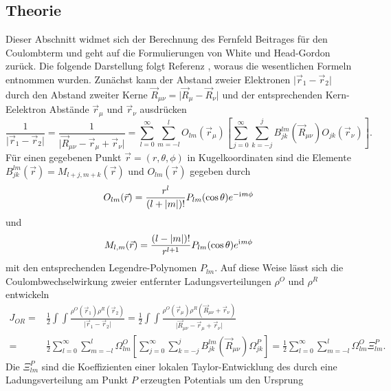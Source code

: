 	\subsection{Theorie}
	Dieser Abschnitt widmet sich der Berechnung des Fernfeld Beitrages für den Coulombterm und geht auf die Formulierungen von White und Head-Gordon\supercite{white1994derivation} zurück. Die folgende Darstellung folgt Referenz \supercite{sierka2003fast}, woraus die wesentlichen Formeln entnommen wurden. Zunächst kann der Abstand zweier Elektronen $\vert\vec{r}_1-\vec{r}_2\vert$ durch den Abstand zweiter Kerne $\vec{R}_{\mu\nu}=\vert\vec{R}_\mu-\vec{R}_\nu\vert$ und der entsprechenden Kern-Eelektron Abstände $\vec{r}_\mu$ und $\vec{r}_\nu$ ausdrücken
	\begin{equation}
	\frac{1}{\vert\vec{r}_1-\vec{r}_2\vert}=\frac{1}{\vert\vec{R}_{\mu\nu}-\vec{r}_\mu+\vec{r}_\nu\vert}=\sum_{l=0}^{\infty}\sum_{m=-l}^l O_{lm}(\vec{r}_\mu)\left[\sum_{j=0}^{\infty}\sum_{k=-j}^jB_{jk}^{lm}(\vec{R}_{\mu\nu})O_{jk}(\vec{r}_\nu)\right].
	\end{equation}
	Für einen gegebenen Punkt $\vec{r}=(r,\theta,\phi)$ in Kugelkoordinaten sind die Elemente $B_{jk}^{lm}(\vec{r})=M_{l+j,m+k}(\vec{r})$ und $O_{lm}(\vec{r})$ gegeben durch
	\begin{equation}
	O_{lm}(\vec{r})=\frac{r^l}{(l+\vert m\vert)!}P_{lm}(\cos \theta)e^{-\mathrm{i}\mkern1mu m\phi}
	\end{equation}
	und 
	\begin{equation}
	M_{l,m}(\vec{r})=\frac{(l-\vert m\vert)!}{r^{l+1}}P_{lm}(\cos \theta)e^{\mathrm{i}\mkern1mu m\phi}
	\end{equation}
	mit den entsprechenden Legendre-Polynomen $P_{lm}$. Auf diese Weise lässt sich die Coulombwechselwirkung zweier entfernter Ladungsverteilungen $\rho^O$ und $\rho^R$ entwickeln
	\begin{equation}\label{eq:marijexpansion}
	\begin{aligned}
	J_{OR}=&\frac{1}{2} \int\int\frac{\rho^O(\vec{r}_1)\rho^R(\vec{r}_2)}{\vert\vec{r}_1-\vec{r}_2\vert}=\frac{1}{2}\int\int\frac{\rho^O(\vec{r}_\mu)\rho^R(\vec{R}_{\mu\nu}+\vec{r}_\nu)}{\vert\vec{R}_{\mu\nu}-\vec{r}_\mu+\vec{r}_\nu\vert}\\
	=&\frac{1}{2}\sum_{l=0}^\infty\sum_{m=-l}^l\Omega_{lm}^O\left[\sum_{j=0}^\infty\sum_{k=-j}^jB_{jk}^{lm}(\vec{R}_{\mu\nu})\Omega_{jk}^P\right]=\frac{1}{2}\sum_{l=0}^\infty\sum_{m=-l}^l\Omega_{lm}^O\Xi_{lm}^P.
	\end{aligned}
	\end{equation}
	Die $\Xi_{lm}^P$ sind die Koeffizienten einer lokalen Taylor-Entwicklung des durch eine Ladungsverteilung am Punkt $P$ erzeugten Potentials um den Ursprung

